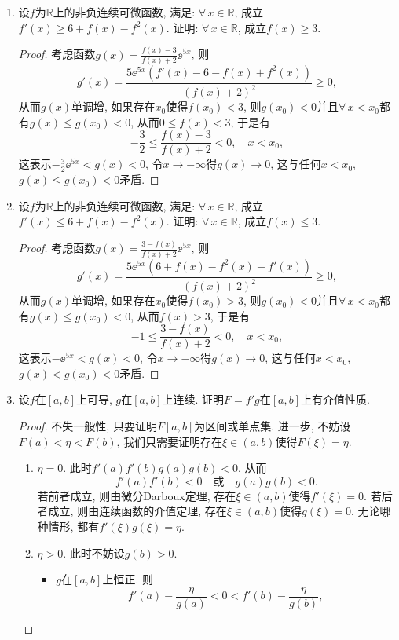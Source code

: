 \begin{4b}
\begin{enumerate}
\begin{proof}
利用上述结论即证.
\end{proof}
\item 设\(f\)为\(\mathbb{R}\)上的非负连续可微函数, 
满足: \(\forall\, x\in\mathbb{R}\), 成立\(f'(x)\geqslant 6+f(x)-f^2(x)\). 
证明: \(\forall\, x\in\mathbb{R}\), 成立\(f(x)\geqslant 3\).
\begin{proof}
考虑函数\(g(x)=\frac{f(x)-3}{f(x)+2}\ee^{5x}\), 则
\[g'(x)=\frac{5\ee^{5x}\left(f'(x)-6-f(x)+f^2(x)\right)}{(f(x)+2)^2}\geqslant 0,\]
从而\(g(x)\)单调增, 如果存在\(x_0\)使得\(f(x_0)<3\), 
则\(g(x_0)<0\)并且\(\forall\, x<x_0\)都有\(g(x)\leqslant g(x_0)<0\), 
从而\(0\leqslant f(x)<3\), 于是有
\[-\frac{3}{2}\leqslant\frac{f(x)-3}{f(x)+2}<0,\quad x<x_0,\]
这表示\(-\frac{3}{2}\ee^{5x}<g(x)<0\), 令\(x\rightarrow-\infty\)得\(g(x)\rightarrow 0\), 这与任何\(x<x_0\), \(g(x)\leqslant g(x_0)<0\)矛盾.
\end{proof}
\item 设\(f\)为\(\mathbb{R}\)上的非负连续可微函数, 满足: \(\forall\, x\in\mathbb{R}\), 成立\(f'(x)\leqslant 6+f(x)-f^2(x)\). 
证明: \(\forall\, x\in\mathbb{R}\), 成立\(f(x)\leqslant 3\).
\begin{proof}
考虑函数\(g(x)=\frac{3-f(x)}{f(x)+2}\ee^{5x}\), 则
\[g'(x)=\frac{5\ee^{5x}\left(6+f(x)-f^2(x)-f'(x)\right)}{(f(x)+2)^2}\geqslant 0,\]
从而\(g(x)\)单调增, 如果存在\(x_0\)使得\(f(x_0)>3\), 
则\(g(x_0)<0\)并且\(\forall\, x<x_0\)都有\(g(x)\leqslant g(x_0)<0\), 从而\(f(x)>3\), 于是有
\[-1\leqslant\frac{3-f(x)}{f(x)+2}<0,\quad x<x_0,\]
这表示\(-\ee^{5x}<g(x)<0\), 令\(x\rightarrow-\infty\)得\(g(x)\rightarrow 0\), 
这与任何\(x<x_0\), \(g(x)<g(x_0)<0\)矛盾.
\end{proof}
\item 设\(f\)在\([a,b]\)上可导, \(g\)在\([a,b]\)上连续. 
证明\(F=f'g\)在\([a,b]\)上有介值性质.
\begin{proof}
不失一般性, 只要证明\(F[a,b]\)为区间或单点集. 进一步, 不妨设\(F(a)<\eta<F(b)\), 
我们只需要证明存在\(\xi\in(a,b)\)使得\(F(\xi)=\eta\).
\begin{enumerate}[label=(\Roman*)]
\item \(\eta=0\). 此时\(f'(a)f'(b)g(a)g(b)<0\). 从而
\[f'(a)f'(b)<0\quad\text{或}\quad g(a)g(b)<0.\]
若前者成立, 则由微分Darboux定理, 存在\(\xi\in(a,b)\)使得\(f'(\xi)=0\). 
若后者成立, 则由连续函数的介值定理, 存在\(\xi\in(a,b)\)使得\(g(\xi)=0\). 
无论哪种情形, 都有\(f'(\xi)g(\xi)=\eta\).
\item \(\eta>0\). 此时不妨设\(g(b)>0\).
\begin{itemize}
\item \(g\)在\([a,b]\)上恒正. 则\[f'(a)-\frac{\eta}{g(a)}<0<f'(b)-\frac{\eta}{g(b)},\]

\end{itemize}
\end{enumerate}
\end{proof}
\end{enumerate}
\end{4b}

